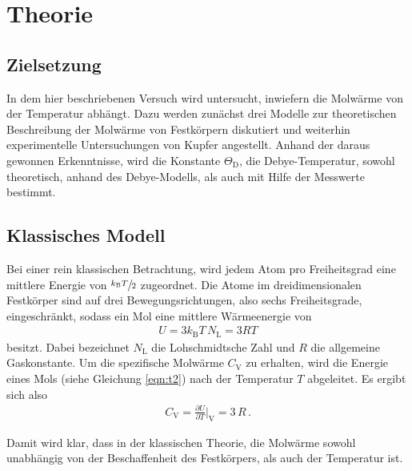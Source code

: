 \section{Theorie}
\label{sec:Theorie}

\subsection{Zielsetzung}
\label{subsec:zielsetzung}
In dem hier beschriebenen Versuch wird untersucht,
inwiefern die Molwärme von der Temperatur abhängt.
Dazu werden zunächst drei Modelle zur theoretischen Beschreibung
der Molwärme von Festkörpern diskutiert und weiterhin experimentelle
Untersuchungen von Kupfer angestellt.
Anhand der daraus gewonnen Erkenntnisse, wird die Konstante $\Theta_{\text{D}}$,
die Debye-Temperatur, sowohl theoretisch, anhand des Debye-Modells,
als auch mit Hilfe der Messwerte bestimmt.

\subsection{Klassisches Modell}
\label{subsec:klassisch}
Bei einer rein klassischen Betrachtung, wird jedem Atom pro Freiheitsgrad eine mittlere
Energie von $\sfrac{k_{\text{B}} T}{2}$ zugeordnet. Die Atome im dreidimensionalen
Festkörper sind auf drei Bewegungsrichtungen, also sechs Freiheitsgrade, eingeschränkt, sodass
ein Mol eine mittlere Wärmeenergie von
\begin{align}
	U = 3 k_{\text{B}} T \, N_{\text{L}} = 3 R T\label{eqn:t2}
\end{align}
besitzt. Dabei bezeichnet $N_{\text{L}}$ die
Lohschmidtsche Zahl und
$R$ die allgemeine Gaskonstante.
Um die spezifische Molwärme $C_{\text{V}}$ zu erhalten,
wird die Energie eines Mols (siehe Gleichung \eqref{eqn:t2})
nach der Temperatur $T$ abgeleitet.
Es ergibt sich also
\begin{align}
	C_{\text{V}} = \frac{\partial U}{\partial T}
	\bigg\vert_{\text{V}} = 3 \, R \, . \label{eqn:t3}
\end{align}

Damit wird klar, dass in der klassischen Theorie,
die Molwärme sowohl unabhängig von der Beschaffenheit des
Festkörpers, als auch der Temperatur ist.


